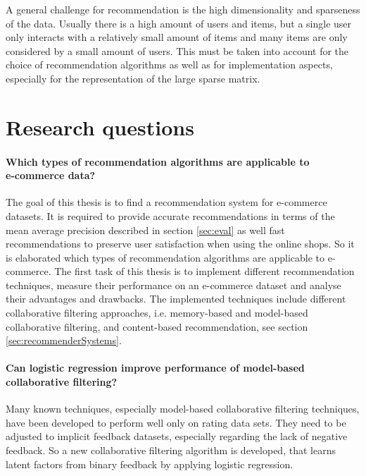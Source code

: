 \documentclass[10pt]{reportMaster}
\begin{document}
A general challenge for recommendation is the high dimensionality and sparseness of the data.
Usually there is a high amount of users and items, but a single user only interacts with a relatively small amount of items and many items are only considered by a small amount of users.
This must be taken into account for the choice of recommendation algorithms as well as for implementation aspects, especially for the representation of the large sparse matrix.


\section{Research questions}
\paragraph{Which types of recommendation algorithms are applicable to \\e-commerce data?}
The goal of this thesis is to find a recommendation system for e-commerce datasets.
It is required to provide accurate recommendations in terms of the mean average precision described in section \ref{sec:eval} as well fast recommendations to preserve user satisfaction when using the online shops.
So it is elaborated which types of recommendation algorithms are applicable to e-commerce.
The first task of this thesis is to implement different recommendation techniques, measure their performance on an e-commerce dataset and analyse their advantages and drawbacks.
The implemented techniques include different collaborative filtering approaches, i.e. memory-based and model-based collaborative filtering, and content-based recommendation, see section \ref{sec:recommenderSystems}.

\paragraph{Can logistic regression improve performance of model-based collaborative filtering?}
Many known techniques, especially model-based collaborative filtering techniques, have been developed to perform well only on rating data sets.
They need to be adjusted to implicit feedback datasets, especially regarding the lack of negative feedback.
So a new collaborative filtering algorithm is developed, that learns latent factors from binary feedback by applying logistic regression.
\end{document}
